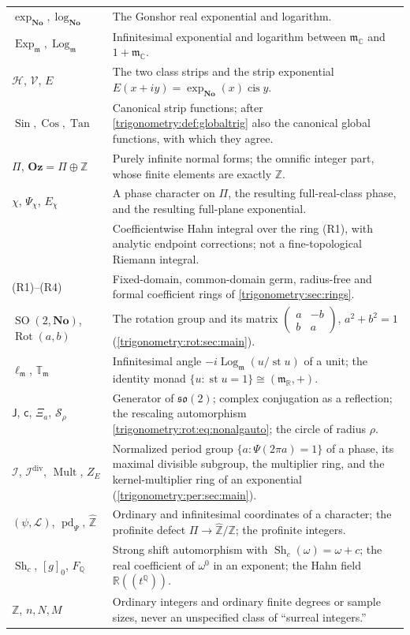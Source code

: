 \documentclass[11pt,letterpaper]{article}
\numberwithin{equation}{section}
\theoremstyle{definition}
\theoremstyle{remark}
\newcommand{\No}{\mathbf{No}}
\newcommand{\Oz}{\mathbf{Oz}}
\newcommand{\R}{\mathbb R}
\newcommand{\C}{\mathbb C}
\newcommand{\Q}{\mathbb Q}
\newcommand{\Z}{\mathbb Z}
\newcommand{\mm}{\mathfrak m}
\newcommand{\TT}{\mathbb T}
\newcommand{\st}{\operatorname{st}}
\newcommand{\cis}{\operatorname{cis}}
\newcommand{\Ex}{\operatorname{Exp}_{\mm}}
\newcommand{\Logm}{\operatorname{Log}_{\mm}}
\newcommand{\Sin}{\operatorname{Sin}}
\newcommand{\Cos}{\operatorname{Cos}}
\newcommand{\Tan}{\operatorname{Tan}}
\newcommand{\SO}{\operatorname{SO}}
\newcommand{\Rot}{\operatorname{Rot}}
\newcommand{\ellm}{\ell_{\mm}}
\newcommand{\Tm}{\TT_{\mm}}
\newcommand{\Mult}{\operatorname{Mult}}
\newcommand{\pd}{\operatorname{pd}}
\newcommand{\Sh}{\operatorname{Sh}}
\newcommand{\Zhat}{\widehat{\Z}}
\newcommand{\cI}{\mathcal I}
\newcommand{\cL}{\mathcal L}
\newcommand{\HInt}{\mathop{\overset{\scriptscriptstyle H}{\int}}\nolimits}
\begin{document}
\begin{center}
\begin{longtable}{@{}L{0.26\textwidth}L{0.67\textwidth}@{}}
$\exp_{\No},\log_{\No}$ & The Gonshor real exponential and logarithm.\\[0.25em]
$\Ex,\Logm$ & Infinitesimal exponential and logarithm between $\mm_{\C}$ and $1+\mm_{\C}$.\\[0.25em]
$\mathscr H$, $\mathscr V$, $E$ & The two class strips and the strip exponential $E(x+iy)=\exp_{\No}(x)\cis y$.\\[0.25em]
$\Sin,\Cos,\Tan$ & Canonical strip functions; after \cref{trigonometry:def:globaltrig} also the canonical global functions, with which they agree.\\[0.25em]
$\Pi$, $\Oz=\Pi\oplus\Z$ & Purely infinite normal forms; the omnific integer part, whose finite elements are exactly $\Z$.\\[0.25em]
$\chi$, $\Psi_\chi$, $E_\chi$ & A phase character on $\Pi$, the resulting full-real-class phase, and the resulting full-plane exponential.\\[0.25em]
$\HInt$ & Coefficientwise Hahn integral over the ring (R1), with analytic endpoint corrections; not a fine-topological Riemann integral.\\[0.25em]
(R1)--(R4) & Fixed-domain, common-domain germ, radius-free and formal coefficient rings of \cref{trigonometry:sec:rings}.\\[0.25em]
$\SO(2,\No)$, $\Rot(a,b)$ & The rotation group and its matrix $\left(\begin{smallmatrix}a&-b\\ b&a\end{smallmatrix}\right)$, $a^2+b^2=1$ (\cref{trigonometry:rot:sec:main}).\\[0.25em]
$\ellm$, $\Tm$ & Infinitesimal angle $-i\Logm(u/\st u)$ of a unit; the identity monad $\{u:\st u=1\}\cong(\mm_{\R},+)$.\\[0.25em]
$\mathsf J$, $\mathsf c$, $\Xi_a$, $\mathcal S_\rho$ & Generator of $\mathfrak{so}(2)$; complex conjugation as a reflection; the rescaling automorphism \cref{trigonometry:rot:eq:nonalgauto}; the circle of radius $\rho$.\\[0.25em]
$\cI$, $\cI^{\mathrm{div}}$, $\Mult$, $Z_E$ & Normalized period group $\{a:\Psi(2\pi a)=1\}$ of a phase, its maximal divisible subgroup, the multiplier ring, and the kernel-multiplier ring of an exponential (\cref{trigonometry:per:sec:main}).\\[0.25em]
$(\psi,\cL)$, $\pd_\Psi$, $\Zhat$ & Ordinary and infinitesimal coordinates of a character; the profinite defect $\Pi\to\Zhat/\Z$; the profinite integers.\\[0.25em]
$\Sh_c$, $[g]_0$, $F_{\Q}$ & Strong shift automorphism with $\Sh_c(\omega)=\omega+c$; the real coefficient of $\omega^0$ in an exponent; the Hahn field $\R((t^{\Q}))$.\\[0.25em]
$\Z$, $n,N,M$ & Ordinary integers and ordinary finite degrees or sample sizes, never an unspecified class of ``surreal integers.''\\
\bottomrule
\end{longtable}
\end{center}
\end{document}
